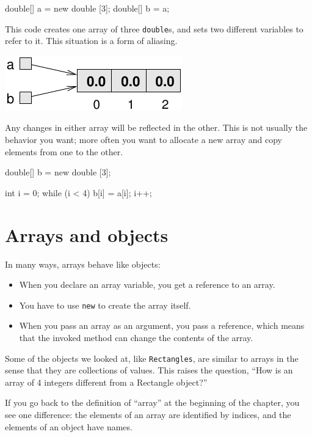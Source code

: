 \begin{code}
    double[] a = new double [3];
    double[] b = a;
\end{code}
%
This code creates one array of three {\tt double}s, and
sets two different variables to refer to it.
This situation is a form of aliasing.


\includegraphics{figs/array3.pdf}


Any changes in either array
will be reflected in the other.  This is not usually the
behavior you want; more often you want to
allocate a new array and copy elements from
one to the other.

\begin{code}
    double[] b = new double [3];

    int i = 0;
    while (i < 4) {
      b[i] = a[i];
      i++;
    }
\end{code}


\section{Arrays and objects}

In many ways, arrays behave like objects:

\begin{itemize}

\item When you declare an array variable, you get a reference
to an array.

\item You have to use {\tt new} to create the array itself.

\item When you pass an array as an argument, you pass a reference,
which means that the invoked method can change the contents
of the array.

\end{itemize}

Some of the objects we looked at, like {\tt Rectangles}, are
similar to arrays in the sense that they are collections of
values.  This raises the question, ``How is an array of 4 integers
different from a Rectangle object?''

If you go back to the definition of ``array'' at the beginning
of the chapter, you see one difference: the
elements of an array are identified by indices, and the
elements of an object have names.

